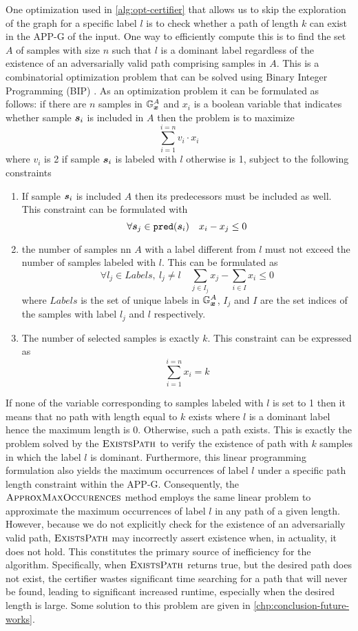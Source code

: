 One optimization used in \autoref{alg:opt-certifier} that allows us to  skip the exploration of the graph for a specific label $l$ is to check whether a path of length $k$ can exist in the \acs{APP-G} of the input. One way to efficiently compute this is to find the set $A$ of samples with size $n$ such that $l$ is a dominant label regardless of the existence of an adversarially valid path comprising samples in $A$. This is a combinatorial optimization problem that can be solved using Binary Integer Programming (BIP) \cite{milp}. As an optimization problem it can be formulated as follows: if there are $n$ samples in $\APPG$ and $x_i$ is a boolean variable that indicates whether sample $\sample[i]$ is included in $A$ then the problem is to maximize
\[
  \sum_{i=1}^{i=n} v_i \cdot x_i
\]
where $v_i$ is 2 if sample $\sample[i]$ is labeled with $l$ otherwise is 1, subject to the following constraints
\begin{enumerate}
  \item If sample $\sample$ is included $A$ then its predecessors must be included as well. This constraint can be formulated with
  \[
    \forall \sample[j] \in \pred{\sample}\quad x_i - x_j \le 0
  \]
  \item the number of samples nn $A$ with a label different from $l$ must not exceed the number of samples labeled with $l$. This can be formulated as
  \[
    \forall l_j \in Labels,\ l_j \neq l\quad \sum_{j \in I_j} x_j - \sum_{i \in I} x_i \le 0
  \]
  where $Labels$ is the set of unique labels in $\APPG$, $I_j$ and $I$ are the set indices of the samples with label $l_j$ and $l$ respectively.

  \item The number of selected samples is exactly $k$. This constraint can be expressed as
  \[
    \sum_{i=1}^{i=n} x_i = k
  \]
\end{enumerate}

If none of the variable corresponding to samples labeled with $l$ is set to 1 then it means that no path with length equal to $k$ exists where $l$ is a dominant label hence the maximum length is 0. Otherwise, such a path exists. This is exactly the problem solved by the $\algtitle{ExistsPath}$ to verify the existence of path with $k$ samples in which the label $l$ is dominant. Furthermore, this linear programming formulation also yields the maximum occurrences of label $l$ under a specific path length constraint within the \acs{APP-G}. Consequently, the $\algtitle{ApproxMaxOccurences}$ method employs the same linear problem to approximate the maximum occurrences of label $l$ in any path of a given length. However, because we do not explicitly check for the existence of an adversarially valid path, $\algtitle{ExistsPath}$ may incorrectly assert existence when, in actuality, it does not hold. This constitutes the primary source of inefficiency for the algorithm. Specifically, when $\algtitle{ExistsPath}$ returns true, but the desired path does not exist, the certifier wastes significant time searching for a path that will never be found, leading to significant increased runtime, especially when the desired length is large. Some solution to this problem are given in \autoref{chp:conclusion-future-works}.

